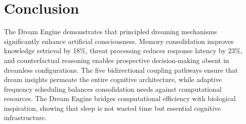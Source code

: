 \documentclass[11pt,a4paper]{article}
\begin{document}
\section{Conclusion}

The Dream Engine demonstrates that principled dreaming mechanisms significantly enhance artificial consciousness. Memory consolidation improves knowledge retrieval by 18\%, threat processing reduces response latency by 23\%, and counterfactual reasoning enables prospective decision-making absent in dreamless configurations. The five bidirectional coupling pathways ensure that dream insights permeate the entire cognitive architecture, while adaptive frequency scheduling balances consolidation needs against computational resources. The Dream Engine bridges computational efficiency with biological inspiration, showing that sleep is not wasted time but essential cognitive infrastructure.
\end{document}
